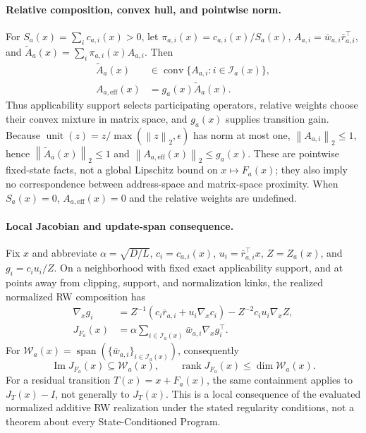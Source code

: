 \documentclass{article}
\newcommand{\norm}[1]{\left\lVert #1 \right\rVert}
\begin{document}
\paragraph{Relative composition, convex hull, and pointwise norm.}
For \(S_a(x)=\sum_i c_{a,i}(x)>0\), let
\(\pi_{a,i}(x)=c_{a,i}(x)/S_a(x)\),
\(A_{a,i}=\bar w_{a,i}\bar r_{a,i}^{\top}\), and
\(\widetilde A_a(x)=\sum_i\pi_{a,i}(x)A_{a,i}\). Then
\[
\begin{aligned}
\widetilde A_a(x)&\in
\operatorname{conv}\{A_{a,i}:i\in\mathcal I_a(x)\},\\
A_{a,\mathrm{eff}}(x)&=g_a(x)\widetilde A_a(x).
\end{aligned}
\]
Thus applicability support selects participating operators, relative weights
choose their convex mixture in matrix space, and \(g_a(x)\) supplies transition
gain. Because \(\operatorname{unit}(z)=z/\max(\norm{z}_2,\epsilon)\) has norm at
most one, \(\norm{A_{a,i}}_2\leq1\), hence
\(\norm{\widetilde A_a(x)}_2\leq1\) and
\(\norm{A_{a,\mathrm{eff}}(x)}_2\leq g_a(x)\). These are pointwise fixed-state
facts, not a global Lipschitz bound on \(x\mapsto F_a(x)\); they also imply no
correspondence between address-space and matrix-space proximity. When
\(S_a(x)=0\), \(A_{a,\mathrm{eff}}(x)=0\) and the relative weights are undefined.

\paragraph{Local Jacobian and update-span consequence.}
Fix \(x\) and abbreviate \(\alpha=\sqrt{D/L}\), \(c_i=c_{a,i}(x)\),
\(u_i=\bar r_{a,i}^{\top}x\), \(Z=Z_a(x)\), and \(g_i=c_i u_i/Z\). On a
neighborhood with fixed exact applicability support, and at points away from
clipping, support, and normalization kinks, the realized normalized RW
composition has
\begin{align*}
\nabla_x g_i
&=Z^{-1}\!\left(c_i\bar r_{a,i}+u_i\nabla_x c_i\right)
-Z^{-2}c_i u_i\nabla_x Z,\\
J_{F_a}(x)
&=\alpha\!\sum_{i\in\mathcal I_a(x)}
\bar w_{a,i}\nabla_x g_i^{\top}.
\end{align*}
For
\(
\mathcal W_a(x)=
\operatorname{span}(\{\bar w_{a,i}\}_{i\in\mathcal I_a(x)})
\), consequently
\[
\operatorname{Im}J_{F_a}(x)\subseteq\mathcal W_a(x),\qquad
\operatorname{rank}J_{F_a}(x)\leq\dim\mathcal W_a(x).
\]
For a residual transition \(T(x)=x+F_a(x)\), the same containment applies to
\(J_T(x)-I\), not generally to \(J_T(x)\). This is a local consequence of the
evaluated normalized additive RW realization under the stated regularity
conditions, not a theorem about every State-Conditioned Program.
\end{document}
